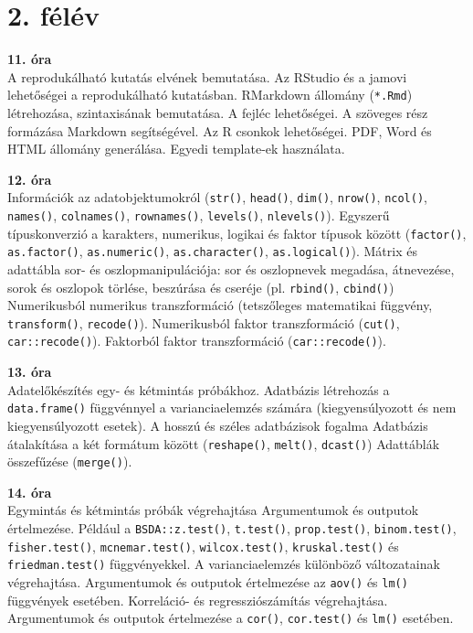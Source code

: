 \documentclass[
]{book}
\begin{document}
\hypertarget{felev-2}{%
\section*{2. félév}\label{felev-2}}

\textbf{11. óra}\\
A reprodukálható kutatás elvének bemutatása. Az RStudio és a jamovi lehetőségei a reprodukálható kutatásban. RMarkdown állomány (\texttt{*.Rmd}) létrehozása, szintaxisának bemutatása. A fejléc lehetőségei. A szöveges rész formázása Markdown segítségével. Az R csonkok lehetőségei. PDF, Word és HTML állomány generálása. Egyedi template-ek használata.

\textbf{12. óra}\\
Információk az adatobjektumokról (\texttt{str()}, \texttt{head()}, \texttt{dim()}, \texttt{nrow()}, \texttt{ncol()}, \texttt{names()}, \texttt{colnames()}, \texttt{rownames()}, \texttt{levels()}, \texttt{nlevels()}). Egyszerű típuskonverzió a karakters, numerikus, logikai és faktor típusok között (\texttt{factor()}, \texttt{as.factor()}, \texttt{as.numeric()}, \texttt{as.character()}, \texttt{as.logical()}). Mátrix és adattábla sor- és oszlopmanipulációja: sor és oszlopnevek megadása, átnevezése, sorok és oszlopok törlése, beszúrása és cseréje (pl. \texttt{rbind()}, \texttt{cbind()}) Numerikusból numerikus transzformáció (tetszőleges matematikai függvény, \texttt{transform()}, \texttt{recode()}). Numerikusból faktor transzformáció (\texttt{cut()}, \texttt{car::recode()}). Faktorból faktor transzformáció (\texttt{car::recode()}).

\textbf{13. óra}\\
Adatelőkészítés egy- és kétmintás próbákhoz. Adatbázis létrehozás a \texttt{data.frame()} függvénnyel a varianciaelemzés számára (kiegyensúlyozott és nem kiegyensúlyozott esetek). A hosszú és széles adatbázisok fogalma Adatbázis átalakítása a két formátum között (\texttt{reshape()}, \texttt{melt()}, \texttt{dcast()}) Adattáblák összefűzése (\texttt{merge()}).

\textbf{14. óra}\\
Egymintás és kétmintás próbák végrehajtása Argumentumok és outputok értelmezése. Például a \texttt{BSDA::z.test()}, \texttt{t.test()}, \texttt{prop.test()}, \texttt{binom.test()}, \texttt{fisher.test()}, \texttt{mcnemar.test()}, \texttt{wilcox.test()}, \texttt{kruskal.test()} és \texttt{friedman.test()} függvényekkel. A varianciaelemzés különböző változatainak végrehajtása. Argumentumok és outputok értelmezése az \texttt{aov()} és \texttt{lm()} függvények esetében. Korreláció- és regressziószámítás végrehajtása. Argumentumok és outputok értelmezése a \texttt{cor()}, \texttt{cor.test()} és \texttt{lm()} esetében.
\end{document}
